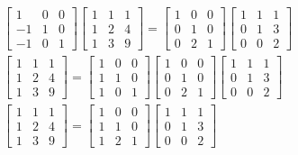 \begin{gather*}
\left[ \begin{array}{ccc} 1 & 0 & 0 \\ -1 & 1 & 0 \\ -1 & 0 & 1 \end{array} \right]
\left[ \begin{array}{ccc} 1 & 1 & 1 \\ 1 & 2 & 4 \\ 1 & 3 & 9 \end{array} \right]
= \left[ \begin{array}{ccc} 1 & 0 & 0 \\ 0 & 1 & 0 \\ 0 & 2 & 1 \end{array} \right]
\left[ \begin{array}{ccc} 1 & 1 & 1 \\ 0 & 1 & 3 \\ 0 & 0 & 2 \end{array} \right] \\
\left[ \begin{array}{ccc} 1 & 1 & 1 \\ 1 & 2 & 4 \\ 1 & 3 & 9 \end{array} \right]
= \left[ \begin{array}{ccc} 1 & 0 & 0 \\ 1 & 1 & 0 \\ 1 & 0 & 1 \end{array} \right]
\left[ \begin{array}{ccc} 1 & 0 & 0 \\ 0 & 1 & 0 \\ 0 & 2 & 1 \end{array} \right]
\left[ \begin{array}{ccc} 1 & 1 & 1 \\ 0 & 1 & 3 \\ 0 & 0 & 2 \end{array} \right] \\
\left[ \begin{array}{ccc} 1 & 1 & 1 \\ 1 & 2 & 4 \\ 1 & 3 & 9 \end{array} \right]
= \left[ \begin{array}{ccc} 1 & 0 & 0 \\ 1 & 1 & 0 \\ 1 & 2 & 1 \end{array} \right]
\left[ \begin{array}{ccc} 1 & 1 & 1 \\ 0 & 1 & 3 \\ 0 & 0 & 2 \end{array} \right] \\
\end{gather*}


